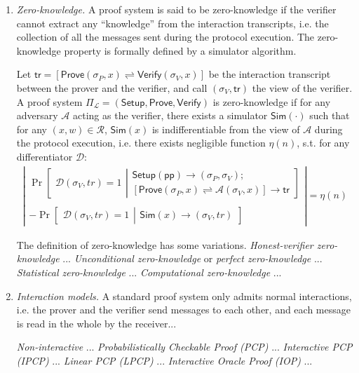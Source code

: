 \documentclass[acmtog]{acmart}
\newcommand{\cA}{\mathcal{A}}
\newcommand{\cD}{\mathcal{D}}
\newcommand{\cL}{\mathcal{L}}
\newcommand{\cR}{\mathcal{R}}
\newcommand{\Setup}{\mathsf{Setup}}
\newcommand{\Prove}{\mathsf{Prove}}
\newcommand{\Verify}{\mathsf{Verify}}
\newcommand{\pp}{\mathsf{pp}}
\newcommand{\PiL}{\Pi_{\cL}}
\newcommand{\Sim}{\mathsf{Sim}}
\newcommand{\tr}{\mathsf{tr}}
\begin{document}
\begin{enumerate}
	\item \emph{Zero-knowledge.} A proof system is said to be zero-knowledge if the verifier cannot extract any ``knowledge'' from the interaction transcripts, i.e. the collection of all the messages sent during the protocol execution.
	The zero-knowledge property is formally defined by a simulator algorithm.
	\begin{definition}
	\label{def:zero.knowledge}
	Let $\tr=[\Prove(\sigma_P, x)\rightleftharpoons\Verify(\sigma_V, x)]$ be the interaction transcript between the prover and the verifier, and call $(\sigma_V,\tr)$ the view of the verifier.
	A proof system $\PiL=(\Setup,\Prove,\Verify)$ is zero-knowledge if for any adversary $\cA$ acting as the verifier, there exists a simulator $\Sim(\cdot)$ such that for any $(x,w)\in\cR$, $\Sim(x)$ is indifferentiable from the view of $\cA$ during the protocol execution, i.e. there exists negligible function $\eta(n)$, s.t. for any differentiator $\cD$:
	\begin{eqnarray}
	\label{eqn:zero.knowledge}
	\left|
	\begin{matrix}
	\Pr\left[
		\begin{matrix}
		\cD(\sigma_V,tr)=1
		\end{matrix}
	\left|
		\begin{matrix}
		\Setup(\pp)\to(\sigma_P,\sigma_V);\\
		[\Prove(\sigma_P, x)\rightleftharpoons\cA(\sigma_V, x)]\to \tr
		\end{matrix}
	\right.\right]\\\\
	-\Pr\left[
		\begin{matrix}
		\cD(\sigma_V,tr)=1
		\end{matrix}
	\left|
		\begin{matrix}
		\Sim(x)\to(\sigma_V,tr)
		\end{matrix}
	\right.\right]
	\end{matrix}
	\right|=\eta(n)
	\end{eqnarray}

	\end{definition}
	The definition of zero-knowledge has some variations.
	\emph{Honest-verifier zero-knowledge} ...
	\emph{Unconditional zero-knowledge} or \emph{perfect zero-knowledge} ...
	\emph{Statistical zero-knowledge} ...
	\emph{Computational zero-knowledge} ...

	\item \emph{Interaction models.} A standard proof system only admits normal interactions, i.e. the prover and the verifier send messages to each other, and each message is read in the whole by the receiver...

	\emph{Non-interactive} ...
	\emph{Probabilistically Checkable Proof (PCP)} ...
	\emph{Interactive PCP (IPCP)} ...
	\emph{Linear PCP (LPCP)} ...
	\emph{Interactive Oracle Proof (IOP)} ...

\end{enumerate}
\end{document}
